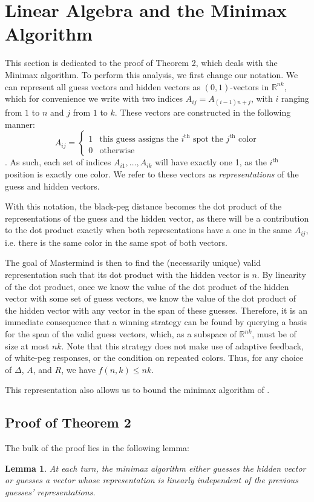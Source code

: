 \documentclass[12pt, a4paper]{article}
\newcommand{\R}{\mathbb{R}}           %
\newtheorem{lemma}{Lemma}
\begin{document}
\section{Linear Algebra and the Minimax Algorithm}
This section is dedicated to the proof of Theorem 2, which deals with the Minimax algorithm. To perform this analysis, we first change our notation. We can represent all guess vectors and hidden vectors as $(0,1)$-vectors in $\R^{nk}$, which for convenience we write with two indices $A_{ij} = A_{(i-1)n+j}$, with $i$ ranging from $1$ to $n$ and $j$ from $1$ to $k$.  These vectors are constructed in the following manner: 
$$
A_{ij} = \begin{cases}
1 & \text{this guess assigns the $i^\text{th}$ spot the $j^\text{th}$ color} \\
0 & \text{otherwise}
\end{cases}
$$. As such, each set of indices $A_{i1},\dots,A_{ik}$ will have exactly one 1, as the $i^\text{th}$ position is exactly one color. We refer to these vectors as \textit{representations} of the guess and hidden vectors.

With this notation, the black-peg distance becomes the dot product of the representations of the guess and the hidden vector, as there will be a contribution to the dot product exactly when both representations have a one in the same $A_{ij}$, i.e. there is the same color in the same spot of both vectors. 

The goal of Mastermind is then to find the (necessarily unique) valid representation such that its dot product with the hidden vector is $n$. By linearity of the dot product, once we know the value of the dot product of the hidden vector with some set of guess vectors, we know the value of the dot product of the hidden vector with any vector in the span of these guesses. Therefore, it is an immediate consequence that a winning strategy can be found by querying a basis for the span of the valid guess vectors, which, as a subspace of $\R^{nk}$, must be of size at most $nk$. Note that this strategy does not make use of adaptive feedback, of white-peg responses, or the condition on repeated colors. Thus, for any choice of $\Delta$, $A$, and $R$, we have $f(n,k) \leq nk$.

This representation also allows us to bound the minimax algorithm of \cite{DK76}. 
\subsection{Proof of Theorem 2}
The bulk of the proof lies in the following lemma:
\begin{lemma}
	At each turn, the minimax algorithm either guesses the hidden vector or guesses a vector whose representation is linearly independent of the previous guesses' representations.
\end{lemma}
\end{document}
